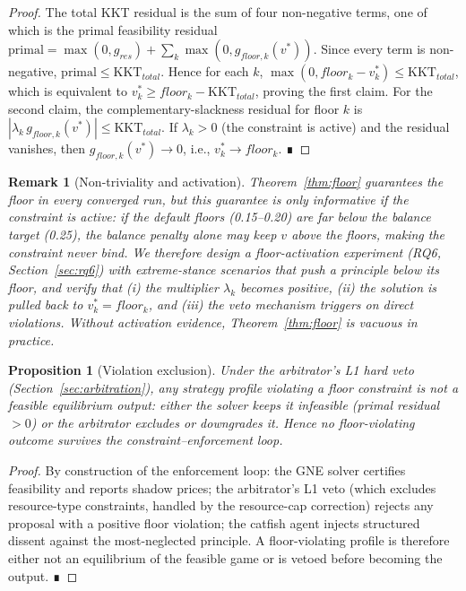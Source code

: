\documentclass[11pt]{article}
\newtheorem{proposition}[theorem]{Proposition}
\newtheorem{remark}[theorem]{Remark}
\begin{document}
\begin{proof}
The total KKT residual is the sum of four non-negative terms, one of which is
the primal feasibility residual
$\mathrm{primal} = \max(0, g_{res}) + \sum_k \max(0, g_{floor,k}(v^{*}))$.
Since every term is non-negative, $\mathrm{primal} \le \mathrm{KKT}_{total}$.
Hence for each $k$,
$\max(0, floor_k - v^{*}_k) \le \mathrm{KKT}_{total}$, which is equivalent
to $v^{*}_k \ge floor_k - \mathrm{KKT}_{total}$, proving the first claim. For
the second claim, the complementary-slackness residual for floor $k$ is
$|\lambda_k\, g_{floor,k}(v^{*})| \le \mathrm{KKT}_{total}$. If
$\lambda_k > 0$ (the constraint is active) and the residual vanishes, then
$g_{floor,k}(v^{*}) \to 0$, i.e., $v^{*}_k \to floor_k$. ∎
\end{proof}

\begin{remark}[Non-triviality and activation]
\label{rem:activation}
Theorem~\ref{thm:floor} guarantees the floor in every converged run, but this
guarantee is only \emph{informative} if the constraint is \emph{active}: if
the default floors (0.15--0.20) are far below the balance target (0.25), the
balance penalty alone may keep $v$ above the floors, making the constraint
never bind. We therefore design a floor-activation experiment (RQ6,
Section~\ref{sec:rq6}) with extreme-stance scenarios that push a principle
below its floor, and verify that (i) the multiplier $\lambda_k$ becomes
positive, (ii) the solution is pulled back to $v^{*}_k = floor_k$, and (iii)
the veto mechanism triggers on direct violations. Without activation
evidence, Theorem~\ref{thm:floor} is vacuous in practice.
\end{remark}

\begin{proposition}[Violation exclusion]
\label{prop:veto}
Under the arbitrator's L1 hard veto (Section~\ref{sec:arbitration}), any
strategy profile violating a floor constraint is not a feasible equilibrium
output: either the solver keeps it infeasible (primal residual $>0$) or the
arbitrator excludes or downgrades it. Hence no floor-violating outcome
survives the constraint--enforcement loop.
\end{proposition}
\begin{proof}
By construction of the enforcement loop: the GNE solver certifies feasibility
and reports shadow prices; the arbitrator's L1 veto (which excludes
resource-type constraints, handled by the resource-cap correction) rejects any
proposal with a positive floor violation; the catfish agent injects structured
dissent against the most-neglected principle. A floor-violating profile is
therefore either not an equilibrium of the feasible game or is vetoed before
becoming the output. ∎
\end{proof}
\end{document}
